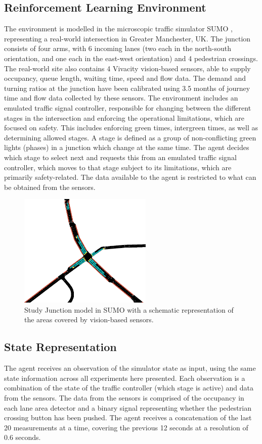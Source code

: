 \documentclass[a4paper, conference]{IEEEtran}
\begin{document}
\subsection{Reinforcement Learning Environment}
The environment is modelled in the microscopic traffic simulator SUMO \cite{sumo}, representing a real-world intersection in Greater Manchester, UK.
The junction consists of four arms, with 6 incoming lanes (two each in the north-south orientation, and one each in the east-west orientation) and 4 pedestrian crossings.
The real-world site also contains 4 Vivacity vision-based sensors, able to supply occupancy, queue length, waiting time, speed and flow data.
The demand and turning ratios at the junction have been calibrated using 3.5 months of journey time and flow data collected by these sensors.
The environment includes an emulated traffic signal controller, responsible for changing between the different stages in the intersection and enforcing the operational limitations, which are focused on safety.
This includes enforcing green times, intergreen times, as well as determining allowed stages.  
A stage is defined as a group of non-conflicting green lights (phases) in a junction which change at the same time.
The agent decides which stage to select next and requests this from an emulated traffic signal controller, which moves to that stage subject to its limitations, which are primarily safety-related.
The data available to the agent is restricted to what can be obtained from the sensors.     
\begin{figure}                                                
\centering                                                    
\includegraphics[width=2.5in]{intersection}                                    
\caption{Study Junction model in SUMO with a schematic representation of the areas covered by vision-based sensors.}                                  
\label{intersection}                                               
\end{figure}     
\subsection{State Representation}
The agent receives an observation of the simulator state as input, using the same state information across all experiments here presented.
Each observation is a combination of the state of the traffic controller (which stage is active) and data from the sensors.
The data from the sensors is comprised of the occupancy in each lane area detector and a binary signal representing whether the pedestrian crossing button has been pushed.
The agent receives a concatenation of the last 20 measurements at a time, covering the previous 12 seconds at a resolution of 0.6 seconds.
\end{document}
